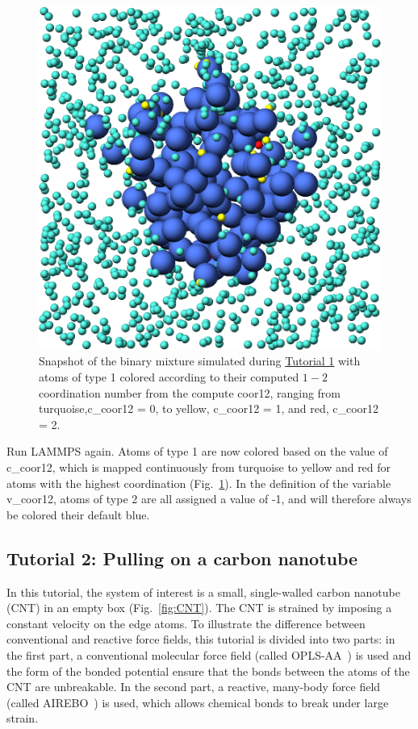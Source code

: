 \documentclass[9pt,tutorial]{livecoms}
\newcommand{\lmpcmd}[1]{\hspace{0pt}\colorbox{listing}{\textcolor{command}{\small{#1}}}\hspace{0pt}} %
\begin{document}
\begin{figure}
\centering
\includegraphics[width=0.55\linewidth]{LJ-coords}
\caption{Snapshot of the binary mixture simulated
  during \hyperref[lennard-jones-label]{Tutorial 1} with atoms of type 1
  colored according to their computed $1-2$ coordination
  number from the compute \lmpcmd{coor12}, ranging from turquoise,\lmpcmd{c\_coor12 = 0},
  to yellow, \lmpcmd{c\_coor12 = 1}, and red, \lmpcmd{c\_coor12 = 2}.}
\label{fig:coords-viz}
\end{figure}

Run LAMMPS again.  Atoms of type 1 are now colored based on the value
of \lmpcmd{c\_coor12}, which is mapped continuously from turquoise to yellow
and red for atoms with the highest coordination (Fig.~\ref{fig:coords-viz}).
In the definition of the variable \lmpcmd{v\_coor12}, atoms of type 2 are
all assigned a value of -1, and will therefore always be colored their default blue.

\subsection{Tutorial 2: Pulling on a carbon nanotube}
\label{carbon-nanotube-label}

In this tutorial, the system of interest is a small, single-walled
carbon nanotube (CNT) in an empty box (Fig.~\ref{fig:CNT}).  The CNT is
strained by imposing a constant velocity on the edge atoms.  To
illustrate the difference between conventional and reactive force
fields, this tutorial is divided into two parts: in the first part, a
conventional molecular force field (called
OPLS-AA~\cite{jorgensenDevelopmentTestingOPLS1996}) is used and the
{\color{blue}form of the bonded potential ensure that the} bonds between
the atoms of the CNT are unbreakable.  In the second part, a reactive,
{\color{blue} many-body} force field (called
AIREBO~\cite{stuart2000reactive}) is used, which allows chemical bonds
to break under large strain.
\end{document}
